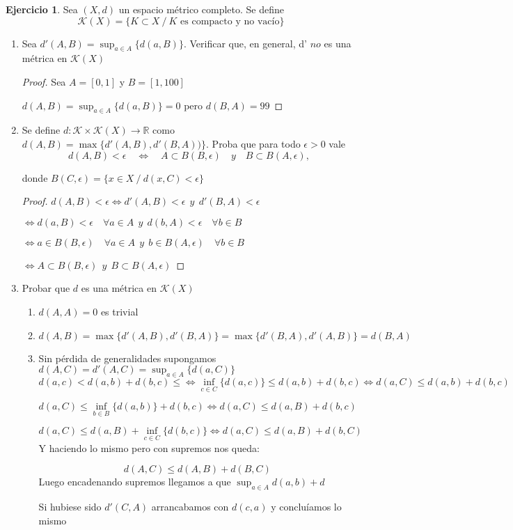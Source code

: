 \documentclass[11pt]{report}
\newcommand{\R}{\mathbb{R}}
\newcommand{\ra}{\rightarrow}
\theoremstyle{definition}
\newtheorem{ej}{Ejercicio}
\begin{document}
	\begin{ej}
		Sea $(X,d)$ un espacio métrico completo. Se define
		$$ \mathcal{K} (X) = \{K\subset X \ / \ K \text{ es compacto y no vacío}\}$$

		\begin{enumerate}
			\item Sea $d'(A,B) = \sup_{a\in A}\{d(a,B)\}$. Verificar que, en general, d' $no$ es una métrica en $\mathcal{K}(X)$
				\begin{proof}
					Sea $A = [0,1]$ y $B = [1,100]$

					$d(A,B) = \sup_{a\in A}\{d(a,B)\} = 0$ pero $d(B,A) = 99$
				\end{proof}
			\item Se define $d: \mathcal{K} \times \mathcal{K} (X) \ra \R$ como $d(A,B) = \max\{ d'(A,B),d'(B,A))\}$. Proba que para todo $\epsilon >0$ vale
				$$ d(A,B) < \epsilon \quad \iff \quad A\subset B(B,\epsilon) \quad y\quad  B\subset B(A,\epsilon),$$

					donde $B(C,\epsilon) = \{x \in X \ / \ d(x,C) < \epsilon\}$

					\begin{proof}
						$d(A,B) < \epsilon \iff d'(A,B) < \epsilon \ \  y \ \ d'(B,A) < \epsilon$

							$\iff d(a,B) < \epsilon \quad \forall a\in A \ \ y \ \ d(b,A)<\epsilon \quad \forall b \in B $

								$\iff a \in B(B,\epsilon) \quad \forall a \in A \ \ y \ \  b \in B(A,\epsilon) \quad \forall b\in B$ 

									$\iff A \subset B(B,\epsilon) \ \ y \ \ B \subset B(A,\epsilon)$
					\end{proof}
				\item Probar que $d$ es una métrica en $\mathcal{K} (X)$

					\begin{enumerate}
						\item $d(A,A) = 0 $ es trivial
						\item $d(A,B) = \max\{d'(A,B),d'(B,A)\} = \max\{d'(B,A),d'(A,B)\} = d(B,A)$
						\item Sin pérdida de generalidades supongamos $d(A,C) = d'(A,C) = \sup_{a\in A}\{d(a,C)\}$
							$$d(a,c) < d(a,b) + d(b,c) \leq \iff \inf_{c \in C}\{d(a,c)\} \leq d(a,b) + d(b,c) \iff d(a,C) \leq d(a,b) + d(b,c)$$

								$$ d(a,C) \leq \inf_{b \in B}\{d(a,b)\} + d(b,c)\iff d(a,C) \leq d(a,B) + d(b,c)$$

									$$ d(a,C ) \leq d(a,B) + \inf_{c\in C}\{d(b,c)\} \iff d(a,C) \leq d(a,B) + d(b,C) $$
										Y haciendo lo mismo pero con supremos nos queda:

										$$ d(A,C) \leq d(A,B) + d(B,C)$$
							Luego encadenando supremos llegamos a que $\sup_{a\in A} d(a,b) + d$ 

							Si hubiese sido $d'(C,A)$ arrancabamos con $d(c,a)$ y concluíamos lo mismo
					\end{enumerate}
		\end{enumerate}
	\end{ej}
	
\end{document}
